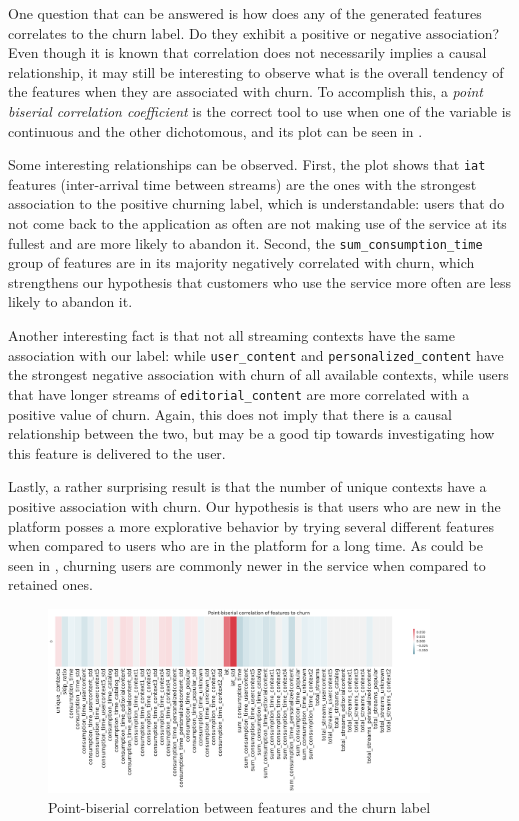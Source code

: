 \documentclass{kththesis}
\begin{document}
One question that can be answered is how does any of the generated features correlates to the churn label. Do they exhibit a positive or negative association? Even though it is known that correlation does not necessarily implies a causal relationship, it may still be interesting to observe what is the overall tendency of the features when they are associated with churn. To accomplish this, a \emph{point biserial correlation coefficient} is the correct tool to use when one of the variable is continuous and the other dichotomous, and its plot can be seen in .

Some interesting relationships can be observed. First, the plot shows that \verb|iat| features (inter-arrival time between streams) are the ones with the strongest association to the positive churning label, which is understandable: users that do not come back to the application as often are not making use of the service at its fullest and are more likely to abandon it. Second, the \verb|sum_consumption_time| group of features are in its majority negatively correlated with churn, which strengthens our hypothesis that customers who use the service more often are less likely to abandon it. 

Another interesting fact is that not all streaming contexts have the same association with our label: while \verb|user_content| and \verb|personalized_content| have the strongest negative association with churn of all available contexts, while users that have longer streams of \verb|editorial_content| are more correlated with a positive value of churn. Again, this does not imply that there is a causal relationship between the two, but may be a good tip towards investigating how this feature is delivered to the user.

Lastly, a rather surprising result is that the number of unique contexts have a positive association with churn. Our hypothesis is that users who are new in the platform posses a more explorative behavior by trying several different features when compared to users who are in the platform for a long time. As could be seen in , churning users are commonly newer in the service when compared to retained ones. 

	\begin{figure}[H]
    \centering
    \includegraphics[width=0.9\textwidth,keepaspectratio]{figures/corr_pbs.pdf}
    \caption{Point-biserial correlation between features and the churn label}
    \label{fig:corr_pbs}
	\end{figure}
\end{document}
